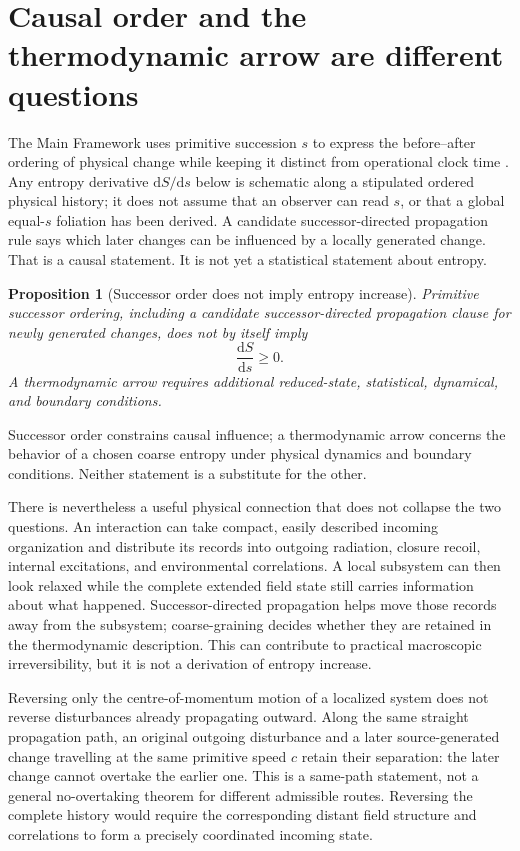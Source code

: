 \documentclass[11pt]{article}
\newtheorem{proposition}[theorem]{Proposition}
\theoremstyle{definition}
\newcommand{\dd}{\mathrm{d}}
\begin{document}
\section{Causal order and the thermodynamic arrow are different questions}
\label{sec:arrows}
The Main Framework uses primitive succession $s$ to express the before--after ordering of
physical change while keeping it distinct from operational clock time
\cite{CmotionMainFramework2026}.  Any entropy derivative $\dd S/\dd s$ below is
schematic along a stipulated ordered physical history; it does not assume that
an observer can read $s$, or that a global equal-$s$ foliation has been derived.
A candidate successor-directed propagation rule says
which later changes can be influenced by a locally generated change.  That is a causal
statement.  It is not yet a statistical statement about entropy.

\begin{proposition}[Successor order does not imply entropy increase]
\label{prop:arrow-separation}
Primitive successor ordering, including a candidate successor-directed propagation
clause for newly generated changes, does not by itself imply
\begin{equation}
  \frac{\dd S}{\dd s}\geq0.
  \label{eq:not-second-law}
\end{equation}
A thermodynamic arrow requires additional reduced-state, statistical, dynamical, and
boundary conditions.
\end{proposition}

Successor order constrains causal influence; a thermodynamic arrow concerns
the behavior of a chosen coarse entropy under physical dynamics and boundary
conditions.  Neither statement is a substitute for the other.

There is nevertheless a useful physical connection that does not collapse the two questions.
An interaction can take compact, easily described incoming organization and distribute its
records into outgoing radiation, closure recoil, internal excitations, and environmental
correlations.  A local subsystem can then look relaxed while the complete extended field
state still carries information about what happened.  Successor-directed propagation helps
move those records away from the subsystem; coarse-graining decides whether they are retained
in the thermodynamic description.  This can contribute to practical macroscopic
irreversibility, but it is not a derivation of entropy increase.

Reversing only the centre-of-momentum motion of a localized system does not
reverse disturbances already propagating outward.  Along the same straight
propagation path, an original outgoing disturbance and a later source-generated
change travelling at the same primitive speed $c$ retain their separation:
the later change cannot overtake the earlier one.  This is a same-path statement,
not a general no-overtaking theorem for different admissible routes.  Reversing
the complete history would require the corresponding distant field structure
and correlations to form a precisely coordinated incoming state.
\end{document}
